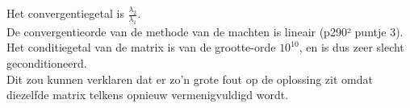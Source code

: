 Het convergentiegetal is $\frac{\lambda_2}{\lambda_1}$. \\
De convergentieorde van de methode van de machten is lineair (p290² puntje 3).\\
Het conditiegetal van de matrix is van de grootte-orde $10^{10}$, en is dus zeer slecht geconditioneerd.\\
Dit zou kunnen verklaren dat er zo'n grote fout op de oplossing zit omdat diezelfde matrix telkens opnieuw vermenigvuldigd wordt.\\